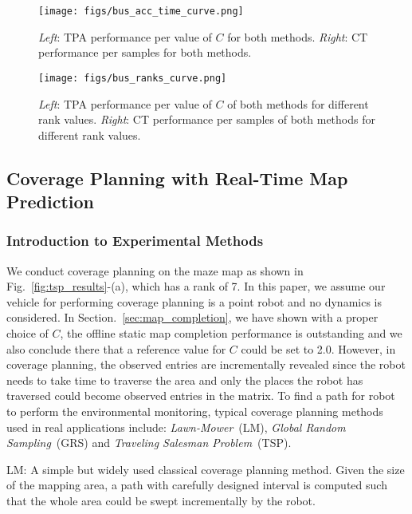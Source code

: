 \begin{figure}%
  \centering
  	{\label{fig:bus_acc_time_curve}\texttt{[image: figs/bus\_acc\_time\_curve.png]}}
  \caption{\small \textit{Left}: TPA performance per value of $C$ for both methods. \textit{Right}: CT performance per samples for both methods. 
  } \vspace{-10pt}
\label{fig:bus_acc_time_curve}  
\end{figure}

\begin{figure}%
  \centering
  	{\label{fig:bus_ranks_curve}\texttt{[image: figs/bus\_ranks\_curve.png]}}
  \caption{\small \textit{Left}: TPA performance per value of $C$ of both methods for different rank values. \textit{Right}: CT performance per samples of both methods for different rank values.
  } \vspace{-10pt}
\label{fig:bus_ranks_curve}  
\end{figure}

\subsection{Coverage Planning with Real-Time Map Prediction}
\subsubsection{Introduction to Experimental Methods}
We conduct coverage planning on the maze map as shown in Fig.~\ref{fig:tsp_results}-(a), which has a rank of 7. In this paper, we assume our vehicle for performing coverage planning is a point robot and no dynamics is considered. In Section.~\ref{sec:map_completion}, we have shown with a proper choice of $C$, the offline static map completion performance is outstanding and we also conclude there that a reference value for $C$ could be set to 2.0. However, in coverage planning, the observed entries are incrementally revealed since the robot needs to take time to traverse the area and only the places the robot has traversed could become observed entries in the matrix. To find a path for robot to perform the environmental monitoring, typical coverage planning methods used in real applications include: \textit{Lawn-Mower}~(LM), \textit{Global Random Sampling}~(GRS) and \textit{Traveling Salesman Problem}~(TSP).

LM: A simple but widely used classical coverage planning method. Given the size of the mapping area, a path with carefully designed interval is computed such that the whole area could be swept incrementally by the robot.

